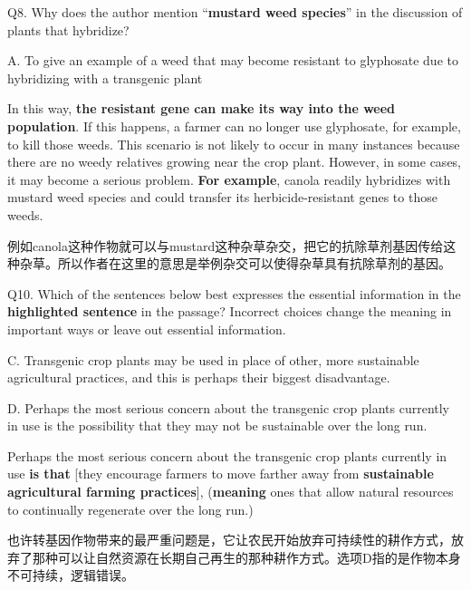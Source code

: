 \begin{blk}
    \begin{qst}
        Q8. Why does the author mention “\textbf{mustard weed species}” in the discussion of plants that hybridize?
    \end{qst}

    \begin{chc}
        A. To give an example of a weed that may become resistant to glyphosate due to hybridizing with a transgenic plant
    \end{chc}

    \begin{psgq}
        In this way, \textbf{the resistant gene can make its way into the weed population}. If this happens, a farmer can no longer use glyphosate, for example, to kill those weeds. This scenario is not likely to occur in many instances because there are no weedy relatives growing near the crop plant. However, in some cases, it may become a serious problem. \textbf{For example}, canola readily hybridizes with mustard weed species and could transfer its herbicide-resistant genes to those weeds.
    \end{psgq}

    \begin{nlz}
        例如canola这种作物就可以与mustard这种杂草杂交，把它的抗除草剂基因传给这种杂草。所以作者在这里的意思是举例杂交可以使得杂草具有抗除草剂的基因。
    \end{nlz}
\end{blk}

\begin{blk}
    \begin{qst}
        Q10. Which of the sentences below best expresses the essential information in the \textbf{highlighted sentence} in the passage? Incorrect choices change the meaning in important ways or leave out essential information.
    \end{qst}

    \begin{chc}
        C. Transgenic crop plants may be used in place of other, more sustainable agricultural practices, and this is perhaps their biggest disadvantage.

        D. Perhaps the most serious concern about the transgenic crop plants currently in use is the possibility that they may not be sustainable over the long run.
    \end{chc}

    \begin{psgq}
        Perhaps the most serious concern about the transgenic crop plants currently in use \textbf{is that} [they encourage farmers to move farther away from \textbf{sustainable agricultural farming practices}], (\textbf{meaning} ones that allow natural resources to continually regenerate over the long run.)
    \end{psgq}

    \begin{nlz}
        也许转基因作物带来的最严重问题是，它让农民开始放弃可持续性的耕作方式，放弃了那种可以让自然资源在长期自己再生的那种耕作方式。选项D指的是作物本身不可持续，逻辑错误。
    \end{nlz}
\end{blk}
